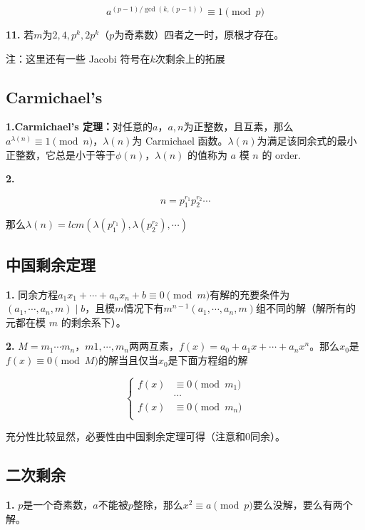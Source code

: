 \documentclass{article}
\begin{document}
\begin{equation}
    a^{(p-1)/\gcd(k,(p-1))}\equiv 1\pmod{p}
\end{equation}

\textbf{11.} 若$m$为$2,4,p^k,2p^k$（$p$为奇素数）四者之一时，原根才存在。

 注：这里还有一些 Jacobi 符号在$k$次剩余上的拓展

\subsection{Carmichael's}

\textbf{1.Carmichael's 定理：}对任意的$a$，$a,n$为正整数，且互素，那么$a^{\lambda(n)}\equiv 1\pmod n$，$\lambda(n)$为 Carmichael 函数。$\lambda(n)$为满足该同余式的最小正整数，它总是小于等于$\phi(n)$，$\lambda(n)$ 的值称为 $a$ 模 $n$ 的 $\text{order}$.

\textbf{2.}

$$n=p_1^{r_1}p_2^{r_2}\cdots$$

那么$\lambda(n)=lcm(\lambda(p_1^{r_1}),\lambda(p_2^{r_2}),\cdots)$

\subsection{中国剩余定理}

\textbf{1.} 同余方程$a_1x_1+\cdots+a_nx_n+b\equiv 0\pmod m$有解的充要条件为$(a_1,\cdots,a_n,m)\mid b$，且模$m$情况下有$m^{n-1}(a_1,\cdots,a_n,m)$组不同的解（解所有的元都在模 $m$ 的剩余系下）。

\textbf{2.} $M=m_1\cdots m_n$，$m1,\cdots,m_n$两两互素，$f(x)=a_0+a_1x+\cdots+a_nx^n$。那么$x_0$是$f(x)\equiv 0\pmod M$的解当且仅当$x_0$是下面方程组的解

\begin{equation}
\begin{cases}
f(x)&\equiv 0\pmod {m_1} \\
&\cdots	\\
f(x)&\equiv 0\pmod {m_n}\\
\end{cases}    
\end{equation}

充分性比较显然，必要性由中国剩余定理可得（注意和$0$同余）。

\subsection{二次剩余}

\textbf{1.} $p$是一个奇素数，$a$不能被$p$整除，那么$x^2\equiv a\pmod{p}$要么没解，要么有两个解。
\end{document}
